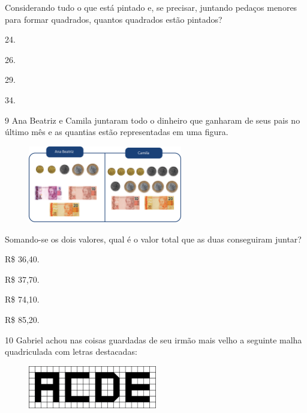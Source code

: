 Considerando tudo o que está pintado e, se precisar, juntando pedaços
menores para formar quadrados, quantos quadrados estão pintados?

\begin{escolha}
\item
  24.
\item
  26.
\item
  29.
\item
  34.
\end{escolha}

\pagebreak
\num{9} Ana Beatriz e Camila juntaram todo o dinheiro que ganharam de seus pais no
último mês e as quantias estão representadas em uma figura.

\begin{figure}[htpb!]
\centering
\includegraphics[width=0.6\textwidth]{./media/image95.png}
\end{figure}

Somando-se os dois valores, qual é o valor total que as duas conseguiram juntar?

\begin{multicols}{2}
\begin{escolha}
\item
  R\$ 36,40.
\item
  R\$ 37,70.
\item
  R\$ 74,10.
\item
  R\$ 85,20.
\end{escolha}
\end{multicols}

\num{10} Gabriel achou nas coisas guardadas de seu irmão mais velho a seguinte malha quadriculada com letras destacadas:

\begin{figure}[htpb!]
\centering
\includegraphics[width=0.5\textwidth]{./media/image96.png}
\end{figure}

